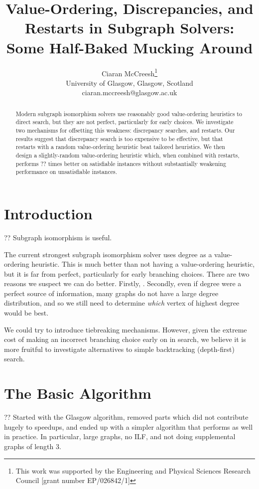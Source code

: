 \documentclass{article}
\title{Value-Ordering, Discrepancies, and Restarts in Subgraph Solvers: \\ Some Half-Baked Mucking
Around}
\author{Ciaran McCreesh\thanks{This work was supported by the Engineering and Physical Sciences
    Research Council [grant number EP/026842/1]}\\ University of Glasgow, Glasgow, Scotland \\
    ciaran.mccreesh@glasgow.ac.uk}
\begin{document}
\maketitle

\begin{abstract}
    Modern subgraph isomorphism solvers use reasonably good value-ordering heuristics to direct
    search, but they are not perfect, particularly for early choices. We investigate two mechanisms
    for offsetting this weakness: discrepancy searches, and restarts. Our results suggest that
    discrepancy search is too expensive to be effective, but that restarts with a random
    value-ordering heuristic beat tailored heuristics. We then design a slightly-random
    value-ordering heuristic which, when combined with restarts, performs ?? times better on
    satisfiable instances without substantially weakening performance on unsatisfiable instances.
\end{abstract}

\section{Introduction}

?? Subgraph isomorphism is useful.

The current strongest subgraph isomorphism solver uses degree as a value-ordering heuristic. This is
much better than not having a value-ordering heuristic, but it is far from perfect, particularly for
early branching choices. There are two reasons we suspect we can do better. Firstly, . Secondly, even if degree
were a perfect source of information, many graphs do not have a large degree distribution, and so we
still need to determine \emph{which} vertex of highest degree would be best.

We could try to introduce tiebreaking mechanisms. However, given the extreme cost of making an
incorrect branching choice early on in search, we believe it is more fruitful to investigate
alternatives to simple backtracking (depth-first) search.

\section{The Basic Algorithm}

?? Started with the Glasgow algorithm, removed parts which did not contribute hugely to speedups,
and ended up with a simpler algorithm that performs as well in practice. In particular, large
graphs, no ILF, and not doing supplemental graphs of length 3.
\end{document}
